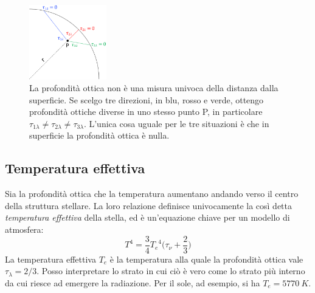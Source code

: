 \begin{figure}
    \centering
    \includegraphics[width=0.3\textwidth]{immagini/profondita-ottica-atmosfera.png}
    \caption{La profondità ottica non è una misura univoca della distanza dalla superficie. Se scelgo tre direzioni, in blu, rosso e verde, ottengo profondità ottiche diverse in uno stesso punto P, in particolare $\tau_{1\lambda} \neq \tau_{2\lambda} \neq \tau_{3\lambda}$. L'unica cosa uguale per le tre situazioni è che in superficie la profondità ottica è nulla.}
    \label{fig:profondita-ottica-atmosfera}
\end{figure}

\subsection{Temperatura effettiva}
Sia la profondità ottica che la temperatura aumentano andando verso il centro della struttura stellare. La loro relazione definisce univocamente la così detta \emph{temperatura effettiva} della stella, ed è un'equazione chiave per un modello di atmosfera:
\begin{equation}\label{temperatura-effettiva}
    T^4 = \frac{3}{4} {T_e}^4 \bigl( \tau_\nu + \frac{2}{3} \bigr)
\end{equation}
La temperatura effettiva $T_e$ è la temperatura alla quale la profondità ottica vale $\tau_\lambda = 2 / 3$. Posso interpretare lo strato in cui ciò è vero come lo strato più interno da cui riesce ad emergere la radiazione. Per il sole, ad esempio, si ha $T_e = \SI{5770}{K}$.

